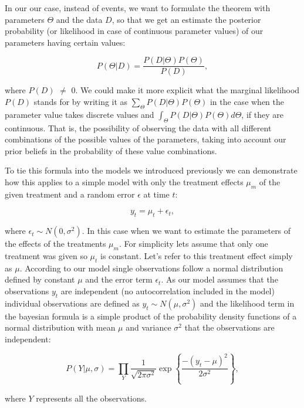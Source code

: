 \documentclass[12pt,a4paper,leqno]{report}
\theoremstyle{plain}
\theoremstyle{definition}
\theoremstyle{remark}
\begin{document}
In our our case, instead of events, we want to formulate the theorem with parameters
\(\Theta \) and the data \(D\), so that we get an estimate the posterior
probability (or likelihood in case of continuous parameter values) of our
parameters having certain values:

\begin{def}\label{}
    \begin{equation}\label{bayeswithparams}
        P(\Theta|D) = \frac{P(D|\Theta)P(\Theta)}{P(D)},
    \end{equation}
\end{def}where \(P(D)\) \(\neq \) 0. We could make it more explicit what the marginal likelihood \(P(D)\) stands for
by writing it as \(\sum_\Theta P(D|\Theta)P(\Theta)\) in the case when the parameter
value takes discrete values and \(\int_\Theta P(D|\Theta)P(\Theta) d\Theta \),
if they are continuous. That is, the possibility of observing the data with all
different combinations of the possible values of the parameters, taking into
account our prior beliefs in the probability of these value combinations.

To tie this formula into the models we introduced previously we can demonstrate
how this applies to a simple model with only the treatment effects \(\mu_m \) of
the given treatment and a random error \(\epsilon \) at time \(t\):

\begin{def}\label{}
    \begin{equation}\label{}
        y_t = \mu_t + \epsilon_t,
    \end{equation}
\end{def}where \(\epsilon_{t} \sim N(0,\sigma^2)\). In this case when we want to estimate the parameters of the effects of the
treatments \(\mu_m\). For simplicity lets assume that only one treatment was
given so \(\mu_t\) is constant. Let's refer to this treatment effect simply as
\(\mu \). According to our model single observations follow a normal
distribution defined by constant \(\mu \) and the error term \(\epsilon_t \). As
our model assumes that the observations \(y_t\) are independent (no
autocorrelation included in the model) individual observations are defined as
\(y_t \sim N(\mu,\sigma^2) \) and the likelihood term in the bayesian formula is
a simple product of the probability density functions of a normal distribution
with mean \(\mu \) and variance \(\sigma^2 \) that the observations are
independent:

\begin{def}\label{}
    \begin{equation}\label{}
        P(Y|\mu, \sigma)
        =
        \prod_{Y}
        \frac{1}
        {{\sqrt {2\pi \sigma^2} }}
        \exp{ \left \{ \frac{-(y_t-\mu)^2} {2\sigma^2} \right \} },
    \end{equation}
\end{def}where \(Y\) represents all the observations.
\end{document}
